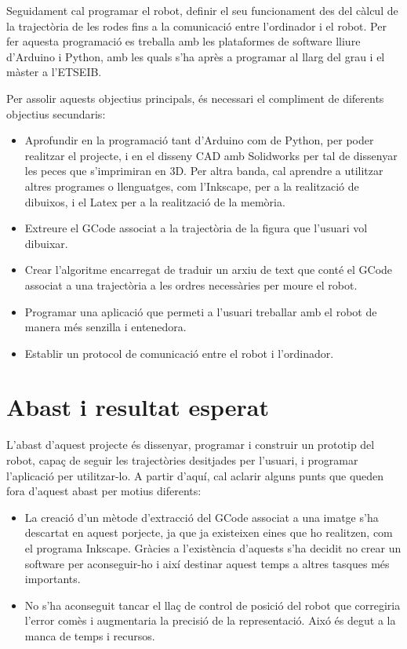 Seguidament cal programar el robot, definir el seu funcionament des del càlcul de la trajectòria de les rodes fins a la comunicació entre l'ordinador i el robot. Per fer aquesta programació es treballa amb les plataformes de software lliure d'Arduino i Python, amb les quals s'ha après a programar al llarg del grau i el màster a l'ETSEIB.

Per assolir aquests objectius principals, és necessari el compliment de diferents objectius secundaris: 

\begin{itemize}
	\item Aprofundir en la programació tant d'Arduino com de Python, per poder realitzar el projecte, i en el disseny CAD amb Solidworks per tal de dissenyar les peces que s'imprimiran en 3D. Per altra banda, cal aprendre a utilitzar altres programes o llenguatges, com l'Inkscape, per a la realització de dibuixos, i el Latex per a la realització de la memòria.
	
	\item Extreure el GCode associat a la trajectòria de la figura que l'usuari vol dibuixar.
	
	\item Crear l'algoritme encarregat de traduir un arxiu de text que conté el GCode associat a una trajectòria a les ordres necessàries per moure el robot. 
	
	\item Programar una aplicació que permeti a l'usuari treballar amb el robot de manera més senzilla i entenedora.
	
	\item Establir un protocol de comunicació entre el robot i l'ordinador.
\end{itemize} 

\section{Abast i resultat esperat}

L'abast d'aquest projecte és dissenyar, programar i construir un prototip del robot, capaç de seguir les trajectòries desitjades per l'usuari, i programar l'aplicació per utilitzar-lo. A partir d'aquí, cal aclarir alguns punts que queden fora d'aquest abast per motius diferents:

\begin{itemize}
	\item La creació d'un mètode d'extracció del GCode associat a una imatge s'ha descartat en aquest porjecte, ja que ja existeixen eines que ho realitzen, com el programa Inkscape. Gràcies a l'existència d'aquests s'ha decidit no crear un software per aconseguir-ho i així destinar aquest temps a altres tasques més importants.
	\item No s'ha aconseguit tancar el llaç de control de posició del robot que corregiria l'error comès i augmentaria la precisió de la representació. Aixó és degut a la manca de temps i recursos.    
\end{itemize}

